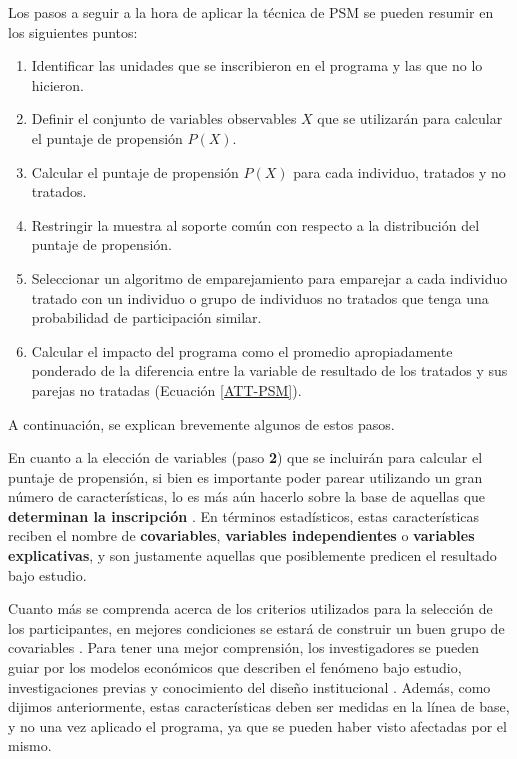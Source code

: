 \documentclass[../../main.tex]{subfiles}
\begin{document}
Los pasos a seguir a la hora de aplicar la técnica de PSM se pueden resumir en los
siguientes puntos:
\begin{enumerate}[label=\textbf{\arabic*.}]
    \item Identificar las unidades que se inscribieron en el programa y las que no lo
    hicieron.
    \item Definir el conjunto de variables observables \(X\) que se utilizarán para
    calcular el puntaje de propensión \(P(X)\).
    \item Calcular el puntaje de propensión \(P(X)\) para cada individuo, tratados
    y no tratados.
    \item Restringir la muestra al soporte común con respecto a la distribución
    del puntaje de propensión.
    \item Seleccionar un algoritmo de emparejamiento para emparejar a cada individuo
    tratado con un individuo o grupo de individuos no tratados que tenga una probabilidad
    de participación similar.
    \item Calcular el impacto del programa como el promedio apropiadamente ponderado de la
    diferencia entre la variable de resultado de los tratados y sus parejas no tratadas
    (Ecuación \ref{ATT-PSM}).
\end{enumerate}
A continuación, se explican brevemente algunos de estos pasos.

En cuanto a la elección de variables (paso \textbf{2}) que se incluirán para calcular el
puntaje de propensión, si bien es importante poder parear utilizando un gran número de
características, lo es más aún hacerlo sobre la base de aquellas que \textbf{determinan la
inscripción} \cite{gertler-2016}.  En términos estadísticos, estas características reciben
el nombre de \textbf{covariables}, \textbf{variables independientes} o \textbf{variables
explicativas}, y son justamente aquellas que posiblemente predicen el resultado bajo
estudio.

Cuanto más se comprenda acerca de los criterios utilizados para la selección de los
participantes, en mejores condiciones se estará de construir un buen grupo de covariables
\cite{gertler-2016}. Para tener una mejor comprensión, los investigadores se pueden guiar
por los modelos económicos que describen el fenómeno bajo estudio, investigaciones previas
y conocimiento del diseño institucional \cite{bernal}. Además, como dijimos anteriormente,
estas características deben ser medidas en la línea de base, y no una vez aplicado el
programa, ya que se pueden haber visto afectadas por el mismo.
\end{document}
